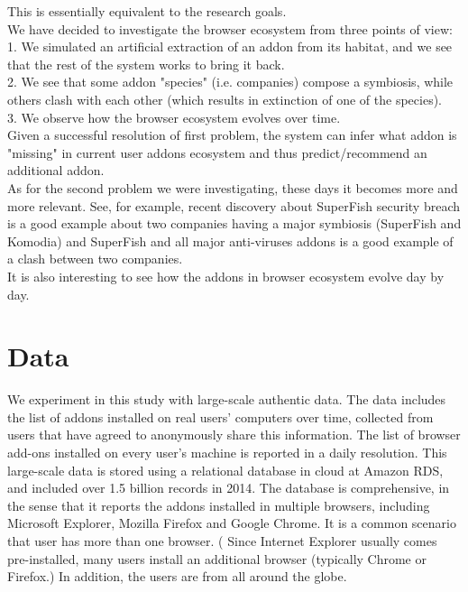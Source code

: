 \documentclass[11pt,oneside]{book}
\let\Oldsection\section
\renewcommand{\section}{\FloatBarrier\Oldsection}
\begin{document}
This is essentially equivalent to the research goals.\\
We have decided to investigate the browser ecosystem from three points of view:\\
1. We simulated an artificial extraction of an addon from its habitat, and we see that the rest of the system works to bring it back.\\
2. We see that some addon "species" (i.e. companies) compose a symbiosis, while others clash with each other (which results in extinction of one of the species).\\
3. We observe how the browser ecosystem evolves over time.\\
Given a successful resolution of first problem, the system can infer what addon is "missing" in current user addons ecosystem and thus predict/recommend an additional addon.\\
As for the second problem we were investigating, these days it becomes more and more relevant. See, for example, recent discovery about SuperFish security breach is a good example about two companies having a major symbiosis (SuperFish and Komodia) and SuperFish and all major anti-viruses addons is a good example of a clash between two companies.\\
It is also interesting to see how the addons in browser ecosystem evolve day by day.



\chapter{Data}
\label{sec:datasets}

We experiment in this study with large-scale authentic data.  The data includes the list of addons installed on real users' computers over time, collected from users that have agreed to anonymously share this information.  The list of browser add-ons installed on every user's machine is reported in a daily resolution.  This large-scale data is stored using a relational database in cloud at Amazon RDS, and included over 1.5 billion records in 2014. The database is comprehensive, in the sense that it  reports the addons installed in multiple browsers, including Microsoft Explorer, Mozilla Firefox and Google Chrome. It  is a common scenario that user has more than one browser. ( Since Internet Explorer usually comes pre-installed, many users install an additional browser (typically Chrome or Firefox.) In addition, the users are from all around the globe. 
\end{document}
